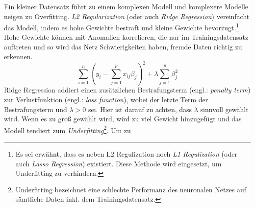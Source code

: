 Ein kleiner Datensatz führt zu einem komplexen Modell und komplexere Modelle neigen zu Overfitting. \textit{L2 Regularization} (oder auch \textit{Ridge Regression}) vereinfacht das Modell, indem es hohe Gewichte bestraft und kleine Gewichte bevorzugt.\footnote{Es sei erwähnt, dass es neben L2 Regulization noch \textit{L1 Regulization} (oder auch \textit{Lasso Regression}) existiert. Diese Methode wird eingesetzt, um Underfitting zu verhindern.} Hohe Gewichte können mit Anomalien korrelieren, die nur im Trainingsdatensatz auftreten und so wird das Netz Schwierigkeiten haben, fremde Daten richtig zu erkennen. 
\begin{equation}\label{equation:l2}
	\sum_{i=1}^n (y_i - \sum_{j=1}^p x_{ij}\beta_j)^2 + \lambda\sum_{j=1}^p\beta_j^2
\end{equation}
Ridge Regression addiert einen zusätzlichen Bestrafungsterm (engl.: \textit{penalty term}) zur Verlustfunktion (engl.: \textit{loss function}), wobei der letzte Term der Bestrafungsterm und $\lambda > 0$ sei. Hier ist darauf zu achten, dass $\lambda$ sinnvoll gewählt wird. Wenn es zu groß gewählt wird, wird zu viel Gewicht hinzugefügt und das Modell tendiert zum \textit{Underfitting}\footnote{Underfitting bezeichnet eine schlechte Performanz des neuronalen Netzes auf sämtliche Daten inkl. dem Trainingsdatensatz.}. Um zu 
